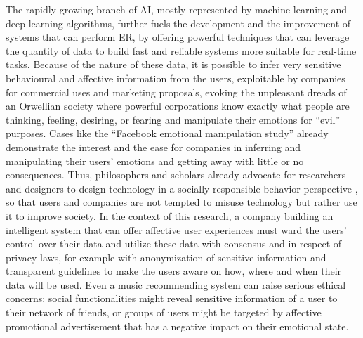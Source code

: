 The rapidly growing branch of \ac{AI}, mostly represented by machine learning and deep learning algorithms, further fuels the development and the improvement of systems that can perform ER, by offering powerful techniques that can leverage the quantity of data to build fast and reliable systems more suitable for real-time tasks. Because of the nature of these data, it is possible to infer very sensitive behavioural and affective information from the users, exploitable by companies for commercial uses and marketing proposals,  evoking the unpleasant dreads of an Orwellian society where powerful corporations know exactly what people are thinking, feeling, desiring, or fearing and manipulate their emotions for “evil” purposes. Cases like the “Facebook emotional manipulation study” \cite{gertz_autonomy_2016} already demonstrate the interest and the ease for companies in inferring and manipulating their users’ emotions and getting away with little or no consequences. Thus, philosophers and scholars already advocate for researchers and designers to design technology in a socially responsible behavior perspective 	\cite{tromp_design_2011}, so that users and companies are not tempted to misuse technology but rather use it to improve society. In the context of this research, a company building an intelligent system that can offer affective user experiences must ward the users’ control over their data and utilize these data with consensus and in respect of privacy laws, for example with anonymization of sensitive information and transparent guidelines to make the users aware on how, where and when their data will be used. Even a music recommending system can raise serious ethical concerns: social functionalities might reveal sensitive information of a user to their network of friends, or groups of users might be targeted by affective promotional advertisement that has a negative impact on their emotional state.

